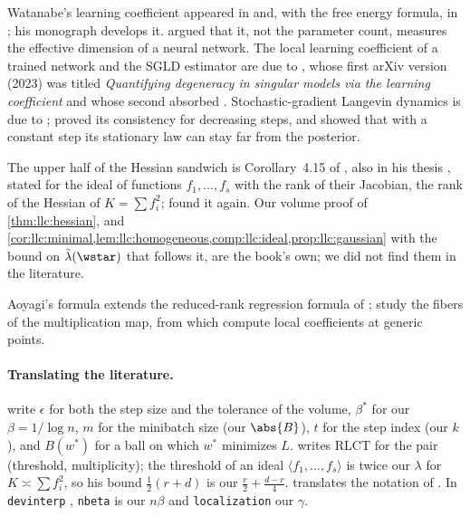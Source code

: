 \begin{refsection}
\notesandrefs
Watanabe's learning coefficient appeared in \textcite{Watanabe1999} and, with the free energy formula, in \textcite{Watanabe2001a}; his monograph \parencite{Watanabe2009} develops it. \textcite{WeiEtAl2023} argued that it, not the parameter count, measures the effective dimension of a neural network. The local learning coefficient of a trained network and the SGLD estimator are due to \textcite{LauEtAl2025}, whose first arXiv version (2023) was titled \emph{Quantifying degeneracy in singular models via the learning coefficient} and whose second absorbed \textcite{FurmanLau2024}. Stochastic-gradient Langevin dynamics is due to \textcite{WellingTeh2011}; \textcite{TehEtAl2016} proved its consistency for decreasing steps, and \textcite{BrosseEtAl2018} showed that with a constant step its stationary law can stay far from the posterior.

The upper half of the Hessian sandwich is Corollary~4.15 of \textcite{Lin2017}, also in his thesis \parencite{Lin2011}, stated for the ideal of functions $f_1,\dots,f_s$ with the rank of their Jacobian, the rank of the Hessian of $K=\sum f_i^2$; \textcite{Bushnaq2024} found it again. Our volume proof of \cref{thm:llc:hessian}, and \cref{cor:llc:minimal,lem:llc:homogeneous,comp:llc:ideal,prop:llc:gaussian} with the bound on $\tilde\lambda(\wstar)$ that follows it, are the book's own; we did not find them in the literature.

Aoyagi's formula \parencite{Aoyagi2024} extends the reduced-rank regression formula of \textcite{AoyagiWatanabe2005}; \textcite{PepinLehalleurRimanyi2024} study the fibers of the multiplication map, from which \textcite{HitchcockHoogland2025} compute local coefficients at generic points.

\paragraph{Translating the literature.} \Textcite{LauEtAl2025} write $\epsilon$ for both the step size and the tolerance of the volume, $\beta^*$ for our $\beta=1/\log n$, $m$ for the minibatch size (our $\abs{B}$), $t$ for the step index (our $k$), and $B(w^*)$ for a ball on which $w^*$ minimizes $L$. \textcite{Lin2017} writes $\mathrm{RLCT}$ for the pair (threshold, multiplicity); the threshold of an ideal $\langle f_1,\dots,f_s\rangle$ is twice our $\lambda$ for $K\asymp\sum f_i^2$, so his bound $\tfrac12(r+d)$ is our $\tfrac r2+\tfrac{d-r}4$.  translates the notation of \textcite{Aoyagi2025}. In \texttt{devinterp} \parencite{vanWingerdenEtAl2024}, \texttt{nbeta} is our $n\beta$ and \texttt{localization} our $\gamma$.

\printchapterbib
\end{refsection}

